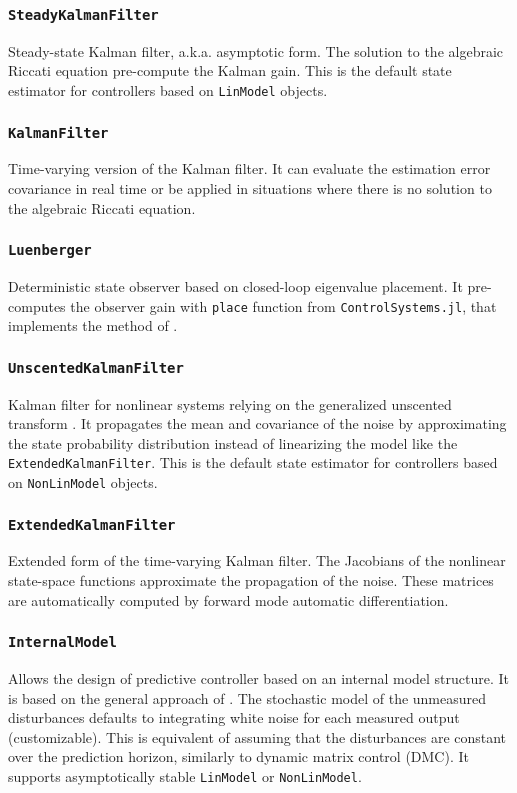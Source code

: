 \subsubsection{\textnormal{\texttt{SteadyKalmanFilter}}}
Steady-state Kalman filter, a.k.a. asymptotic form. The solution to the algebraic Riccati equation pre-compute the Kalman gain. This is the default state estimator for controllers based on \texttt{LinModel} objects.

\subsubsection{\textnormal{\texttt{KalmanFilter}}}
Time-varying version of the Kalman filter. It can evaluate the estimation error covariance in real time or be applied in situations where there is no solution to the algebraic Riccati equation.

\subsubsection{\textnormal{\texttt{Luenberger}}}
Deterministic state observer based on closed-loop eigenvalue placement. It pre-computes the observer gain with \texttt{place} function from \texttt{ControlSystems.jl}, that implements the method of \citet{placePoles}.

\subsubsection{\textnormal{\texttt{UnscentedKalmanFilter}}}
Kalman filter for nonlinear systems relying on the generalized unscented transform \citep{kalmanBook}. It propagates the mean and covariance of the noise by approximating the state probability distribution instead of linearizing the model like the \texttt{ExtendedKalmanFilter}. This is the default state estimator for controllers based on \texttt{NonLinModel} objects.

\subsubsection{\textnormal{\texttt{ExtendedKalmanFilter}}}
Extended form of the time-varying Kalman filter. The Jacobians of the nonlinear state-space functions approximate the propagation of the noise. These matrices are automatically computed by forward mode automatic differentiation.

\subsubsection{\textnormal{\texttt{InternalModel}}}
Allows the design of predictive controller based on an internal model structure. It is based on the general approach of \citet{globPC}. The stochastic model of the unmeasured disturbances defaults to integrating white noise for each measured output (customizable). This is equivalent of assuming that the disturbances are constant over the prediction horizon, similarly to dynamic matrix control (DMC). It supports asymptotically stable \texttt{LinModel} or \texttt{NonLinModel}.


